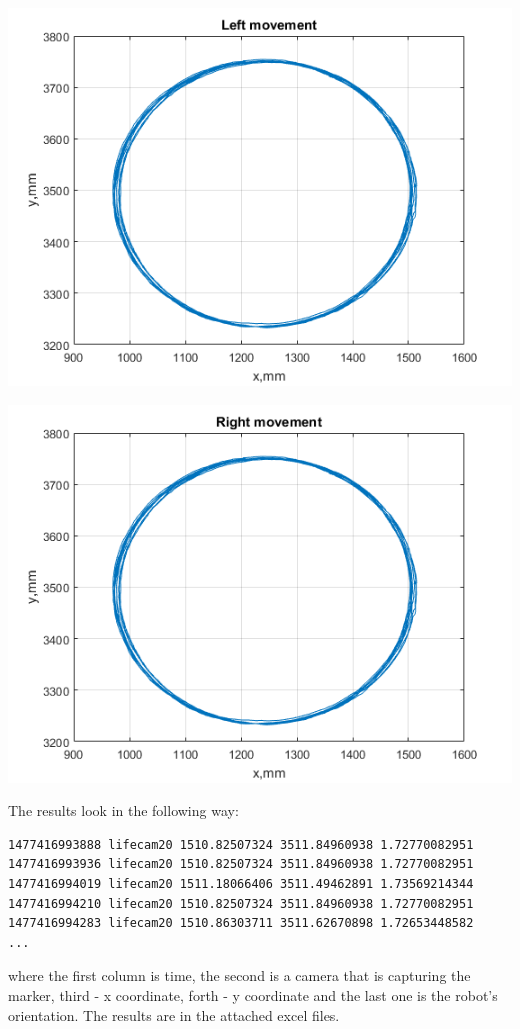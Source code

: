 \documentclass[a4paper, 12pt]{article}
\begin{document}
\begin{center}
  \includegraphics[scale = 0.8]{ll.png}

  \includegraphics[scale = 0.8]{rr.png}
\end{center}

The results look in the following way:

\begin{lstlisting}
1477416993888 lifecam20 1510.82507324 3511.84960938 1.72770082951
1477416993936 lifecam20 1510.82507324 3511.84960938 1.72770082951
1477416994019 lifecam20 1511.18066406 3511.49462891 1.73569214344
1477416994210 lifecam20 1510.82507324 3511.84960938 1.72770082951
1477416994283 lifecam20 1510.86303711 3511.62670898 1.72653448582
...
\end{lstlisting}
where the first column is time, the second is a camera that is capturing the marker, third - x coordinate, forth - y coordinate and the last one is the robot's orientation. The results are in the attached excel files.
\end{document}
